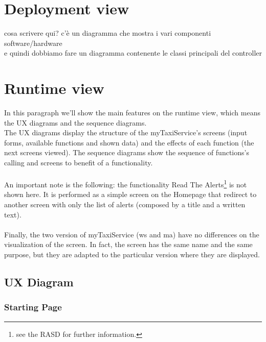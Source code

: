 \documentclass[\mainpath/main]{subfiles}
\begin{document}
\section{Deployment view}
\label{ArchitecturalDesign:deploy}

cosa scrivere qui? c'è un diagramma che mostra i vari componenti software/hardware\\
e quindi dobbiamo fare un diagramma contenente le classi principali del controller

\section{Runtime view}
\label{ArchitecturalDesign:runtime}

In this paragraph we'll show the main features on the runtime view, which means the UX diagrams and the sequence diagrams.\\
The UX diagrams display the structure of the myTaxiService's screens (input forms, available functions and shown data) and the effects of each function (the next screens viewed). The sequence diagrams show the sequence of functions's calling and screens to benefit of a functionality.\\
\\
An important note is the following: the functionality Read The Alerts\footnote{see the RASD for further information.} is not shown here. It is performed as a simple screen on the Homepage that redirect to another screen with only the list of alerts (composed by a title and a written text).\\
\\
Finally, the two version of myTaxiService (\gls{ws} and \gls{ma}) have no differences on the visualization of the screen. In fact, the screen has the same name and the same purpose, but they are adapted to the particular version where they are displayed.\\

\clearpage

\subsection{UX Diagram}
\label{ArchitecturalDesign:UX}

\subsubsection{Starting Page}
\label{ArchitecturalDesign:UX_StartingPage}
\end{document}
